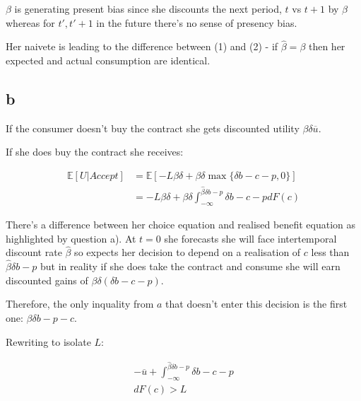 \documentclass{article}
\begin{document}
$\beta$ is generating present bias since she discounts the next period, $t$ vs 
$t+1$ by $\beta$ whereas for $t', t'+1$ in the future there's no sense of 
presency bias.


Her naivete is leading to the difference between (1) and (2) - if $\hat{\beta} = \beta$
then her expected and actual consumption are identical.


\subsection*{b}


If the consumer doesn't buy the contract she gets discounted utility $\beta \delta \overline{u}$.

If she does buy the contract she receives:

\begin{align*}
    \mathbb{E}[U | \textit{Accept}] &= \mathbb{E}\left[ 
        -L\beta \delta + \beta \delta \max\{\delta b - c - p, 0\} 
    \right] \\
    &= -L \beta \delta + \beta \delta \int^{\hat{\beta}\delta b - p}_{-\infty} \delta b - c - p dF(c)
\end{align*}


There's a difference between her choice equation and realised benefit equation as 
highlighted by question a). At $t=0$ she forecasts she will face intertemporal 
discount rate $\hat{\beta}$ so expects her decision to depend on a realisation of 
$c$ less than $\hat{\beta}\delta b - p$ but in reality if she does take the 
contract and consume she will earn discounted gains of $\beta \delta (\delta b - c - p)$. 



Therefore, the only inquality from $a$ that doesn't enter this decision is the 
first one: $\beta \delta b - p - c$.


Rewriting to isolate $L$:

\begin{align*}
    - \overline{u} + \int^{\hat{\beta}\delta b - p}_{-\infty} \delta b - c - p \\ dF(c) > L
\end{align*}
\end{document}

